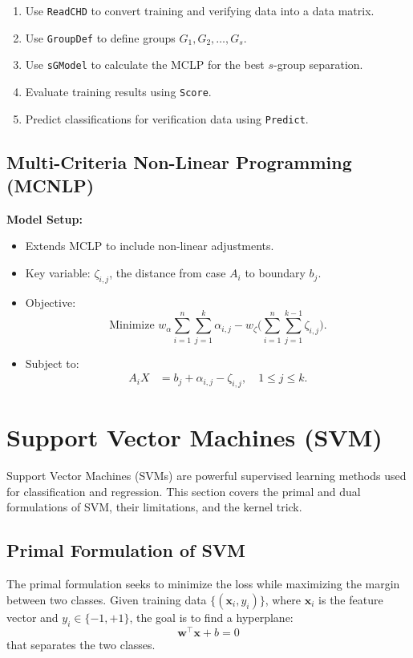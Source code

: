 \documentclass[12pt,a4paper]{article}
\begin{document}
\begin{enumerate}
    \item Use \texttt{ReadCHD} to convert training and verifying data into a data matrix.
    \item Use \texttt{GroupDef} to define groups \(G_1, G_2, \dots, G_s\).
    \item Use \texttt{sGModel} to calculate the MCLP for the best \(s\)-group separation.
    \item Evaluate training results using \texttt{Score}.
    \item Predict classifications for verification data using \texttt{Predict}.
\end{enumerate}

\subsection{Multi-Criteria Non-Linear Programming (MCNLP)}

\textbf{Model Setup:}
\begin{itemize}
    \item Extends MCLP to include non-linear adjustments.
    \item Key variable: \(\zeta_{i,j}\), the distance from case \(A_i\) to boundary \(b_j\).
    \item Objective:
    \[
    \text{Minimize } w_\alpha \sum_{i=1}^n \sum_{j=1}^k \alpha_{i,j} - w_\zeta \Bigg(\sum_{i=1}^n \sum_{j=1}^{k-1} \zeta_{i,j}\Bigg).
    \]
    \item Subject to:
    \begin{align*}
        A_i X &= b_j + \alpha_{i,j} - \zeta_{i,j}, \quad 1 \leq j \leq k.
    \end{align*}
\end{itemize}





\section{Support Vector Machines (SVM)}
Support Vector Machines (SVMs) are powerful supervised learning methods used for classification and regression. This section covers the primal and dual formulations of SVM, their limitations, and the kernel trick.

\subsection{Primal Formulation of SVM}
The primal formulation seeks to minimize the loss while maximizing the margin between two classes. Given training data $\{(\mathbf{x}_i, y_i)\}$, where $\mathbf{x}_i$ is the feature vector and $y_i \in \{-1, +1\}$, the goal is to find a hyperplane:
\[
\mathbf{w}^\top \mathbf{x} + b = 0
\]
that separates the two classes.
\end{document}
